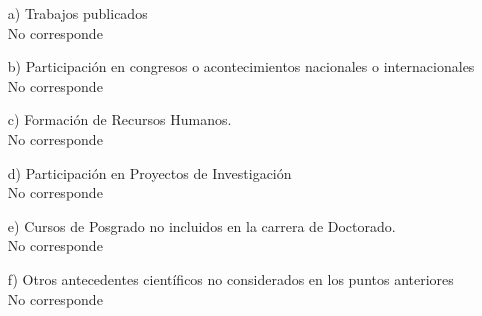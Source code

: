 \begin{enumerate}[leftmargin=0.8cm]
  \item[a)]{Trabajos publicados
    \\ No corresponde
  }

  \item[b)]{Participación en congresos o acontecimientos nacionales o internacionales
   \\ No corresponde
  }

  \item[c)]{Formación de Recursos Humanos.
    \\ No corresponde
  }

  \item[d)]{Participación en Proyectos de Investigación
    \\ No corresponde
  }

  \item[e)]{Cursos de Posgrado no incluidos en la carrera de Doctorado.
    \\ No corresponde
  }

  \item[f)]{Otros antecedentes científicos no considerados en los puntos anteriores
    \\ No corresponde
  }

\end{enumerate}
